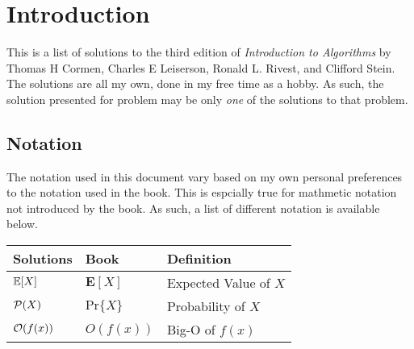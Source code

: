 \documentclass[../Algorithms]{subfiles}
\begin{document}
	\chapter*{Introduction}

	This is a list of solutions to the third edition of \textit{Introduction to Algorithms} by Thomas H Cormen, Charles E Leiserson, Ronald L. Rivest, and Clifford Stein. The solutions are all my own, done in my free time as a hobby. As such, the solution presented for problem may be only \textit{one} of the solutions to that problem.

	\section*{Notation}

	The notation used in this document vary based on my own personal preferences to the notation used in the book. This is espcially true for mathmetic notation not introduced by the book. As such, a list of different notation is available below.
	
	\begin{table}[ht]
		\begin{tabular}{l | l | l}
			\textbf{Solutions} & \textbf{Book} & \textbf{Definition}\\
			\hline
			$\mathbb{E}[X]$ & $\mathbf{E}[X]$ & Expected Value of $X$\\
			$\mathcal{P}(X)$ & $\mathrm{Pr}\{X\}$ & Probability of $X$\\
			$\mathcal{O}(f(x))$ & $O(f(x))$ & Big-O of $f(x)$
		\end{tabular}
	\end{table}
	
\end{document}
